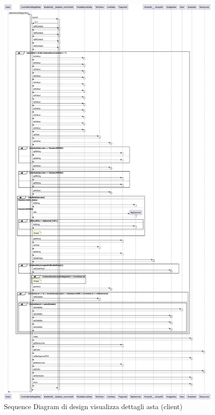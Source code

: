         \begin{figure}[htbp!]
            \centering
                \includegraphics[width=0.7\linewidth]{Immagini/Diagrammi/Sequence Diagram/Client Sequence Design/ClientSequenceDettagliAstaDesign.pdf}
            \caption{Sequence Diagram di design visualizza dettagli asta (client)}
            \label{fig:Sequence Diagram di design visualizza dettagli asta (client)}
        \end{figure}
